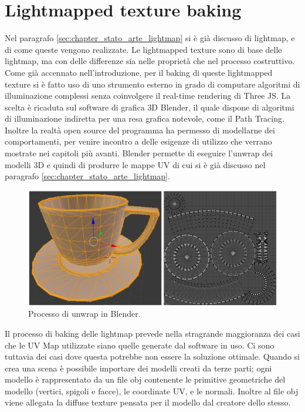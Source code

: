\newpage
\section{Lightmapped texture baking}
\label{sec:chapter_lrl_li_te_ba}

Nel paragrafo \ref{sec:chapter_stato_arte_lightmap} si è già discusso di lightmap, e di come queste vengono realizzate.
Le lightmapped texture sono di base delle lightmap, ma con delle differenze sia nelle proprietà che nel processo costruttivo. 
\\
Come già accennato nell’introduzione, per il baking di queste lightmapped texture si è fatto uso di uno strumento esterno in grado di computare algoritmi di illuminazione complessi senza coinvolgere il real-time rendering di Three JS. La scelta è ricaduta sul software di grafica 3D Blender, il quale dispone di algoritmi di illuminazione indiretta per una resa grafica notevole, come il Path Tracing. Inoltre la realtà open source del programma ha permesso di modellarne dei comportamenti, per venire incontro a delle esigenze di utilizzo che verrano mostrate nei capitoli più avanti. Blender permette di eseguire l’unwrap dei modelli 3D e quindi di produrre le mappe UV di cui si è già discusso nel paragrafo \ref{sec:chapter_stato_arte_lightmap}. 
\\
\begin{figure}[htb]
 \centering
 \includegraphics[width=1\linewidth]{images/chapter_lrl/lrl_unwrap.png}\hfill
 \caption[Blender unwrap]{Processo di unwrap in Blender.}
 \label{fig:lrl_unwrap}
\end{figure}
Il processo di baking delle lightmap prevede nella stragrande maggioranza dei casi che le UV Map utilizzate siano quelle generate dal software in uso. Ci sono tuttavia dei casi dove questa potrebbe non essere la soluzione ottimale.
Quando si crea una scena è possibile importare dei modelli creati da terze parti; ogni modello è rappresentato da un file obj contenente le primitive geometriche del modello (vertici, spigoli e facce), le coordinate UV, e le normali. Inoltre al file obj viene allegata la diffuse texture pensata per il modello dal creatore dello stesso.
